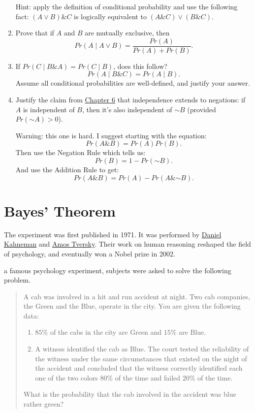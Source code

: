 \documentclass[justified]{tufte-book}
\providecommand{\tightlist}{%
  \setlength{\itemsep}{0pt}\setlength{\parskip}{0pt}}
\newcommand{\given}{\mid}
\renewcommand{\neg}{\mathbin{\sim}}
\renewcommand{\wedge}{\mathbin{\&}}
\newcommand{\p}{Pr}
\newenvironment{problem}{\begin{quote}\normalsize}{\end{quote}}
\theoremstyle{definition}
\theoremstyle{definition}
\theoremstyle{definition}
\theoremstyle{remark}
\begin{document}
\begin{enumerate}
  Hint: apply the definition of conditional probability and use the
  following fact: \((A \vee B) \wedge C\) is logically equivalent to
  \((A \wedge C) \vee (B \wedge C)\).
\item
  Prove that if \(A\) and \(B\) are mutually exclusive, then
  \[\p(A \given A \vee B) = \frac{ \p(A) }{ \p(A) + \p(B) }.\]
\item
  If \(\p(C \given B \wedge A) = \p(C \given B)\), does this follow?
  \[\p(A \given B \wedge C) = Pr(A \given B).\] Assume all conditional
  probabilities are well-defined, and justify your answer.
\item
  Justify the claim from
  \protect\hyperlink{declaring-independence}{Chapter 6} that
  independence extends to negations: if \(A\) is independent of \(B\),
  then it's also independent of \(\neg B\) (provided
  \(\p(\neg A) > 0\)).

  Warning: this one is hard. I suggest starting with the equation:
  \[ \p(A \wedge B) = \p(A) \p(B). \] Then use the Negation Rule which
  tells us: \[ \p(B) = 1 - \p(\neg B). \] And use the Addition Rule to
  get: \[ \p(A \wedge B) = \p(A) - \p(A \wedge \neg B).\]
\end{enumerate}

\hypertarget{chbayes}{%
\chapter{Bayes' Theorem}\label{chbayes}}

\begin{marginfigure}
The experiment was first published in 1971. It was performed by
\href{https://en.wikipedia.org/wiki/Daniel_Kahneman}{Daniel Kahneman}
and \href{https://en.wikipedia.org/wiki/Amos_Tversky}{Amos Tversky}.
Their work on human reasoning reshaped the field of psychology, and
eventually won a Nobel prize in 2002.
\end{marginfigure}

 a famous psychology experiment, subjects were asked to
solve the following problem.

\begin{problem}
A cab was involved in a hit and run accident at night. Two cab
companies, the Green and the Blue, operate in the city. You are given
the following data:

\begin{enumerate}
\def\labelenumi{\arabic{enumi}.}
\tightlist
\item
  \(85\%\) of the cabs in the city are Green and \(15\%\) are Blue.
\item
  A witness identified the cab as Blue. The court tested the reliability
  of the witness under the same circumstances that existed on the night
  of the accident and concluded that the witness correctly identified
  each one of the two colors \(80\%\) of the time and failed \(20\%\) of
  the time.
\end{enumerate}

What is the probability that the cab involved in the accident was blue
rather green?
\end{problem}
\end{document}
